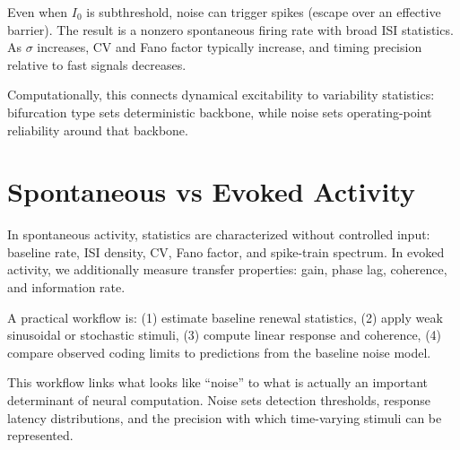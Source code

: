 Even when $I_0$ is subthreshold, noise can trigger spikes (escape over an effective barrier). The result is a nonzero spontaneous firing rate with broad ISI statistics. As $\sigma$ increases, CV and Fano factor typically increase, and timing precision relative to fast signals decreases.

Computationally, this connects dynamical excitability to variability statistics: bifurcation type sets deterministic backbone, while noise sets operating-point reliability around that backbone.

\section{Spontaneous vs Evoked Activity}
\label{sec:spont-vs-evoked}

In spontaneous activity, statistics are characterized without controlled input: baseline rate, ISI density, CV, Fano factor, and spike-train spectrum. In evoked activity, we additionally measure transfer properties: gain, phase lag, coherence, and information rate.

A practical workflow is:
(1) estimate baseline renewal statistics,
(2) apply weak sinusoidal or stochastic stimuli,
(3) compute linear response and coherence,
(4) compare observed coding limits to predictions from the baseline noise model.

This workflow links what looks like ``noise'' to what is actually an important determinant of neural computation. Noise sets detection thresholds, response latency distributions, and the precision with which time-varying stimuli can be represented.


